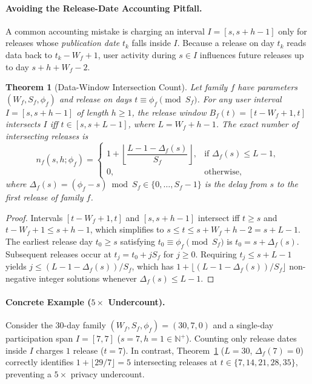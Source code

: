 \documentclass[sigconf, nonacm]{acmart}
\newtheorem{theorem}{Theorem}
\begin{document}
\paragraph{Avoiding the Release-Date Accounting Pitfall.}
A common accounting mistake is charging an interval $I = [s, s+h-1]$ only for releases whose \emph{publication date} $t_k$ falls inside $I$. Because a release on day $t_k$ reads data back to $t_k - W_f + 1$, user activity during $s \in I$ influences future releases up to day $s + h + W_f - 2$.

\begin{theorem}[Data-Window Intersection Count]
\label{thm:intersection}
Let family $f$ have parameters $(W_f, S_f, \phi_f)$ and release on days $t \equiv \phi_f \pmod{S_f}$. For any user interval $I = [s, s+h-1]$ of length $h \ge 1$, the release window $B_f(t) = [t - W_f + 1, t]$ intersects $I$ iff $t \in [s, s + L - 1]$, where $L = W_f + h - 1$. The exact number of intersecting releases is
\begin{equation}
\label{eq:intersection}
n_f(s, h; \phi_f) = \begin{cases}
1 + \left\lfloor \dfrac{L - 1 - \Delta_f(s)}{S_f} \right\rfloor, & \text{if } \Delta_f(s) \le L - 1, \\[8pt]
0, & \text{otherwise},
\end{cases}
\end{equation}
where $\Delta_f(s) = (\phi_f - s) \bmod S_f \in \{0, \dots, S_f - 1\}$ is the delay from $s$ to the first release of family $f$.
\end{theorem}
\begin{proof}
Intervals $[t - W_f + 1, t]$ and $[s, s+h-1]$ intersect iff $t \ge s$ and $t - W_f + 1 \le s + h - 1$, which simplifies to $s \le t \le s + W_f + h - 2 = s + L - 1$. The earliest release day $t_0 \ge s$ satisfying $t_0 \equiv \phi_f \pmod{S_f}$ is $t_0 = s + \Delta_f(s)$. Subsequent releases occur at $t_j = t_0 + jS_f$ for $j \ge 0$. Requiring $t_j \le s + L - 1$ yields $j \le (L - 1 - \Delta_f(s))/S_f$, which has $1 + \lfloor (L - 1 - \Delta_f(s)) / S_f \rfloor$ non-negative integer solutions whenever $\Delta_f(s) \le L - 1$.
\end{proof}

\paragraph{Concrete Example ($5\times$ Undercount).}
Consider the 30-day family $(W_f, S_f, \phi_f) = (30, 7, 0)$ and a single-day participation span $I = [7, 7]$ ($s=7, h=1 \in \mathbb{N}^+$). Counting only release dates inside $I$ charges $1$ release ($t=7$). In contrast, Theorem~\ref{thm:intersection} ($L = 30$, $\Delta_f(7) = 0$) correctly identifies $1 + \lfloor 29/7 \rfloor = 5$ intersecting releases at $t \in \{7, 14, 21, 28, 35\}$, preventing a $5\times$ privacy undercount.
\end{document}
